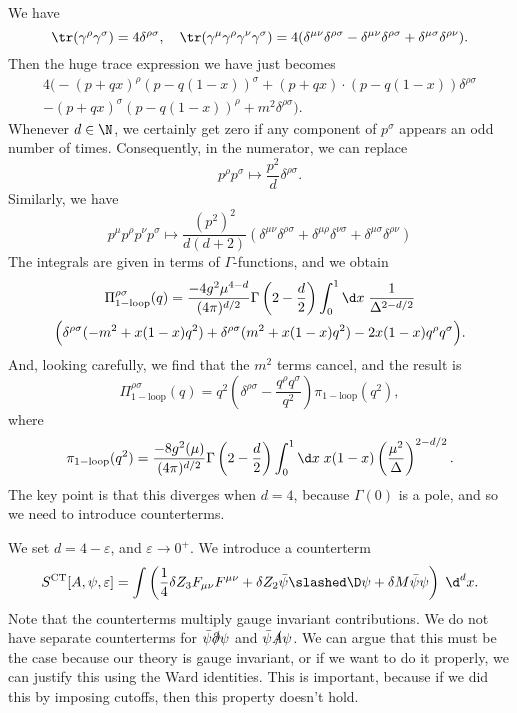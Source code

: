 \documentclass[a4paper]{article}
\begin{document}
We have
\[
  \tr(\gamma^\rho \gamma^\sigma) = 4 \delta^{\rho\sigma},\quad \tr (\gamma^\mu \gamma^\rho \gamma^\nu \gamma^\sigma) = 4 (\delta^{\mu\nu}\delta^{\rho\sigma} - \delta^{\mu\nu} \delta^{\rho\sigma} + \delta^{\mu\sigma}\delta^{\rho\nu}).
\]
Then the huge trace expression we have just becomes
\begin{multline*}
  4\Big(-(p + qx)^\rho (p - q(1 - x))^\sigma + (p + qx) \cdot (p - q (1 - x)) \delta^{\rho\sigma} \\
  - (p + qx)^\sigma(p - q(1 - x))^\rho + m^2 \delta^{\rho\sigma}\Big).
\end{multline*}
Whenever $d \in \N$, we certainly get zero if any component of $p^\sigma$ appears an odd number of times. Consequently, in the numerator, we can replace
\[
  p^\rho p^\sigma \mapsto \frac{p^2}{d} \delta^{\rho\sigma}.
\]
Similarly, we have
\[
  p^\mu p^\rho p^\nu p^\sigma \mapsto \frac{(p^2)^2}{d(d + 2)} (\delta^{\mu\nu} \delta^{\rho\sigma} + \delta^{\mu\rho} \delta^{\nu\sigma} + \delta^{\mu\sigma}\delta^{\rho\nu})
\]
The integrals are given in terms of $\Gamma$-functions, and we obtain
\begin{multline*}
  \Pi^{\rho\sigma}_{\mathrm{1-loop}}(q) = \frac{-4g^2 \mu^{4 - d}}{(4\pi)^{d/2}} \Gamma\left(2 - \frac{d}{2}\right) \int_0^1 \d x\;\frac{1}{\Delta^{2 - d/2}}\\
  \Big(\delta^{\rho\sigma} (-m^2 + x(1 - x)q^2) + \delta^{\rho\sigma}(m^2 + x(1 - x)q^2) - 2x(1 - x) q^\rho q^\sigma\Big).
\end{multline*}
And, looking carefully, we find that the $m^2$ terms cancel, and the result is
\[
  \Pi_{\mathrm{1-loop}}^{\rho\sigma}(q) = q^2 \left(\delta^{\rho\sigma} - \frac{q^\rho q^\sigma}{q^2}\right) \pi_{\mathrm{1-loop}}(q^2),
\]
where
\[
  \pi_{\mathrm{1-loop}}(q^2) = \frac{-8 g^2(\mu)}{(4\pi)^{d/2}} \Gamma\left(2 - \frac{d}{2}\right) \int_0^1 \d x\; x(1 - x) \left(\frac{\mu^2}{\Delta}\right)^{2 - d/2}.
\]
The key point is that this diverges when $d = 4$, because $\Gamma(0)$ is a pole, and so we need to introduce counterterms.

We set $d = 4 - \varepsilon$, and $\varepsilon \to 0^+$. We introduce a counterterm
\[
  S^{\mathrm{CT}}[A, \psi, \varepsilon] = \int \left(\frac{1}{4} \delta Z_3 F_{\mu\nu}F^{\mu\nu} + \delta Z_2 \bar\psi \slashed\D \psi + \delta M \bar\psi \psi\right)\;\d^d x.
\]
Note that the counterterms multiply gauge invariant contributions. We do not have separate counterterms for $\bar{\psi} \slashed\partial \psi$ and $\bar\psi \slashed{A} \psi$. We can argue that this must be the case because our theory is gauge invariant, or if we want to do it properly, we can justify this using the Ward identities. This is important, because if we did this by imposing cutoffs, then this property doesn't hold.
\end{document}
